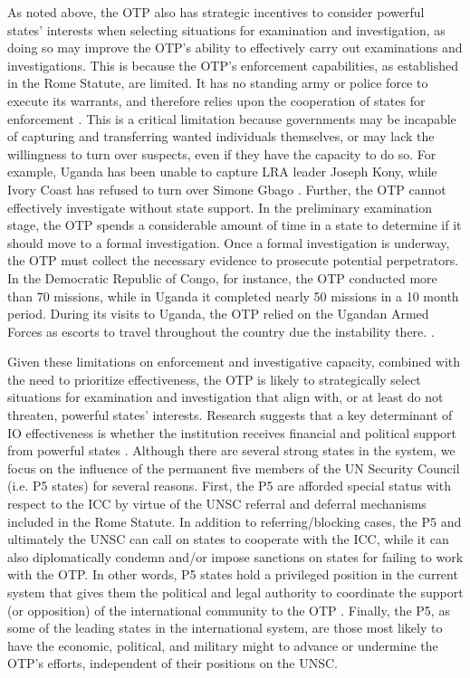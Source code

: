 As noted above, the OTP also has strategic incentives to consider powerful states' interests when selecting situations for examination and investigation, as doing so may improve the OTP's ability to effectively carry out examinations and investigations. This is because the OTP's enforcement capabilities, as established in the Rome Statute, are limited. It has no standing army or police force to execute its warrants, and therefore relies upon the cooperation of states for enforcement \citep{goldsmith2003limits, prorok2017compatibility}. This is a critical limitation because governments may be incapable of capturing and transferring wanted individuals themselves, or may lack the willingness to turn over suspects, even if they have the capacity to do so. For example, Uganda has been unable to capture LRA leader Joseph Kony, while Ivory Coast has refused to turn over Simone Gbago \citep{bbcivory_2013}. Further, the OTP cannot effectively investigate without state support. In the preliminary examination stage, the OTP spends a considerable amount of time in a state to determine if it should move to a formal investigation. Once a formal investigation is underway, the OTP must collect the necessary evidence to prosecute potential perpetrators. In the Democratic Republic of Congo, for instance, the OTP conducted more than 70 missions, while in Uganda it completed nearly 50 missions in a 10 month period. During its visits to Uganda, the OTP relied on the Ugandan Armed Forces as escorts to travel throughout the country due the instability there. \citep{hrw1}.

Given these limitations on enforcement and investigative capacity, combined with the need to prioritize effectiveness, the OTP is likely to strategically select situations for examination and investigation that align with, or at least do not threaten, powerful states' interests. Research suggests that a key determinant of IO effectiveness is whether the institution receives financial and political support from powerful states \citep[168]{barnett2004rules}. Although there are several strong states in the system, we focus on the influence of the permanent five members of the UN Security Council (i.e. P5 states) for several reasons. First, the P5 are afforded special status with respect to the ICC by virtue of the UNSC referral and deferral mechanisms included in the Rome Statute. In addition to referring/blocking cases, the P5 and ultimately the UNSC can call on states to cooperate with the ICC, while it can also diplomatically condemn and/or impose sanctions on states for failing to work with the OTP. In other words, P5 states hold a privileged position in the current system that gives them the political and legal authority to coordinate the support (or opposition) of the international community to the OTP \citep{voeten2005political}. Finally, the P5, as some of the leading states in the international system, are those most likely to have the economic, political, and military might to advance or undermine the OTP's efforts, independent of their positions on the UNSC.

